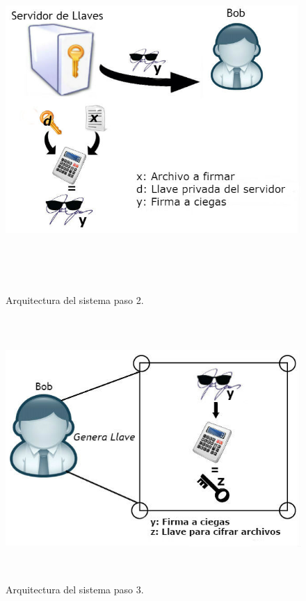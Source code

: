 \begin{figure}[H]
\centering
\includegraphics[width=16cm, height=13cm]{./images/Paso02.jpg}
\caption{Arquitectura del sistema paso 2.}

\end{figure}

\begin{figure}[H]
\centering
\includegraphics[width=16cm, height=10cm]{./images/Paso03.jpg}
\caption{Arquitectura del sistema paso 3.}

\end{figure}

